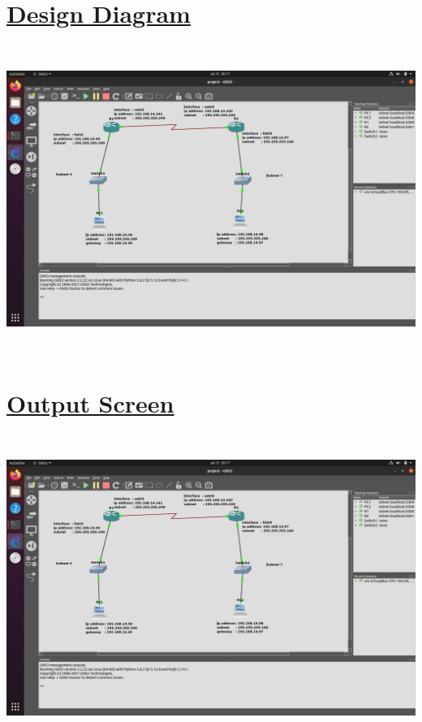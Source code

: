 \documentclass[a4paper]{report}
\begin{document}
    \section*{\underline{Design Diagram}}
    \includegraphics[width=16cm, height=10cm]{design.png}

    \section*{\underline{Output Screen}}
    \includegraphics[width=16cm, height=10cm]{design.png}

    
\end{document}
